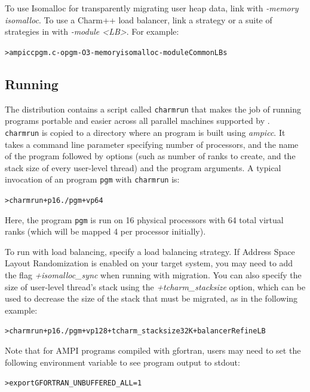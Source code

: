 \documentclass[10pt]{article}
\begin{document}
To use Isomalloc for transparently migrating user heap data, link with
\emph{-memory isomalloc}. To use a Charm++ load balancer, link a strategy
or a suite of strategies in with \emph{-module \textless LB\textgreater}. For example:

\begin{alltt}
> ampicc pgm.c -o pgm -O3 -memory isomalloc -module CommonLBs
\end{alltt}


\subsection{Running}
The \charmpp{} distribution contains a script called \texttt{charmrun} that
makes the job of running \ampi{} programs portable and easier across all
parallel machines supported by \charmpp{}. \texttt{charmrun} is copied to a
directory where an \ampi{} program is built using \emph{ampicc}. It takes a command
line parameter specifying number of processors, and the name of the program
followed by \ampi{} options (such as number of ranks to create, and the stack size
of every user-level thread) and the program arguments. A typical invocation of an \ampi{}
program \texttt{pgm} with \texttt{charmrun} is:

\begin{alltt}
> charmrun +p16 ./pgm +vp64
\end{alltt}

Here, the \ampi{} program \texttt{pgm} is run on 16 physical processors with
64 total virtual ranks (which will be mapped 4 per processor initially).

To run with load balancing, specify a load balancing strategy. If Address Space
Layout Randomization is enabled on your target system, you may need to add the
flag \emph{+isomalloc\_sync} when running with migration. You can also specify
the size of user-level thread's stack using the \emph{+tcharm\_stacksize}
option, which can be used to decrease the size of the stack that must be
migrated, as in the following example:

\begin{alltt}
> charmrun +p16 ./pgm +vp128 +tcharm_stacksize 32K +balancer RefineLB
\end{alltt}

Note that for AMPI programs compiled with gfortran, users may need to set the following
environment variable to see program output to stdout:
\begin{alltt}
> export GFORTRAN_UNBUFFERED_ALL=1
\end{alltt}
\end{document}

